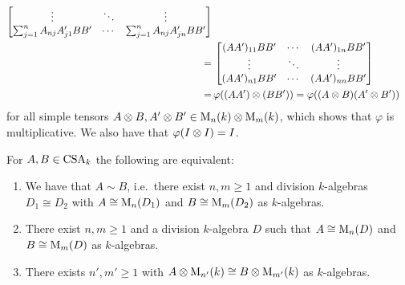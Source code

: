 \begin{remark}
\begin{align*}
\begin{bmatrix}
            \vdots                            & \ddots  & \vdots                            \\
            \sum_{j=1}^n A_{nj} A'_{j1} B B'  & \cdots  & \sum_{j=1}^n A_{nj} A'_{jn} B B'
          \end{bmatrix}
          \\
    =&\,  \begin{bmatrix}
            (A A')_{11} B B' & \cdots  & (A A')_{1n} B B' \\
            \vdots           & \ddots  & \vdots           \\
            (A A')_{n1} B B' & \cdots  & (A A')_{nn} B B'
          \end{bmatrix}
    \\
    =&\,  \varphi((A A') \mathbin{\otimes} (B B'))
    =     \varphi((A \mathbin{\otimes} B) (A' \mathbin{\otimes} B'))
  \end{align*}
  \endgroup
  for all simple tensors $A \mathbin{\otimes} B, A' \mathbin{\otimes} B' \in \operatorname{M}_n(k) \mathbin{\otimes} \operatorname{M}_m(k)$, which shows that $\varphi$ is multiplicative.
  We also have that $\varphi(I \mathbin{\otimes} I) = I$.
\end{remark}


\begin{lemma}
  \label{lemma: characterization of Brauer equivalence}
  For $A, B \in \operatorname{CSA}_k$ the following are equivalent:
  \begin{enumerate}
    \item
      \label{enumerate: matrices over isomorphic division algebra}
      We have that $A \sim B$, i.e.\ there exist $n, m \geq 1$ and division $k$-algebras $D_1 \cong D_2$ with $A \cong \operatorname{M}_n(D_1)$ and $B \cong \operatorname{M}_m(D_2)$ as $k$-algebras.
    \item
      \label{enumerate: matrices over same division algebra}
      There exist $n, m \geq 1$ and a division $k$-algebra $D$ such that $A \cong \operatorname{M}_n(D)$ and $B \cong \operatorname{M}_m(D)$ as $k$-algebras.
    \item
      \label{enumerate: up to tensor with a matrix ring}
      There exists $n', m' \geq 1$ with $A \mathbin{\otimes} \operatorname{M}_{n'}(k) \cong B \mathbin{\otimes} \operatorname{M}_{m'}(k)$ as $k$-algebras.
  \end{enumerate}
\end{lemma}



